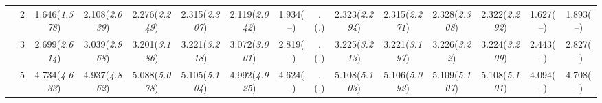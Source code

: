 \documentclass{article}
\begin{document}
\begin{table}[tbp]
{\begin{tabularx}{\textwidth}{lCCCCCCCCCCCCCC}
&2&1.646\newline (\emph{1.578})&2.108\newline (\emph{2.039})&2.276\newline (\emph{2.249})&2.315\newline (\emph{2.307})&2.119\newline (\emph{2.042})&1.934\newline (--)&.\newline (\emph{.})&2.323\newline (\emph{2.294})&2.315\newline (\emph{2.271})&2.328\newline (\emph{2.308})&2.322\newline (\emph{2.292})&1.627\newline (--)&1.893\newline (--) \tabularnewline
&3&2.699\newline (\emph{2.614})&3.039\newline (\emph{2.968})&3.201\newline (\emph{3.186})&3.221\newline (\emph{3.218})&3.072\newline (\emph{3.001})&2.819\newline (--)&.\newline (\emph{.})&3.225\newline (\emph{3.213})&3.221\newline (\emph{3.197})&3.226\newline (\emph{3.22})&3.224\newline (\emph{3.209})&2.443\newline (--)&2.827\newline (--) \tabularnewline
&5&4.734\newline (\emph{4.633})&4.937\newline (\emph{4.862})&5.088\newline (\emph{5.078})&5.105\newline (\emph{5.104})&4.992\newline (\emph{4.925})&4.624\newline (--)&.\newline (\emph{.})&5.108\newline (\emph{5.103})&5.106\newline (\emph{5.092})&5.109\newline (\emph{5.107})&5.108\newline (\emph{5.101})&4.094\newline (--)&4.708\newline (--) \tabularnewline

\end{tabularx}}
\end{table}
\end{document}
